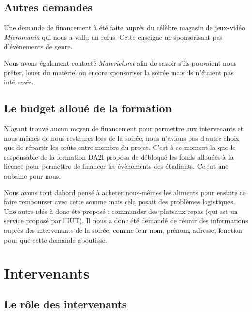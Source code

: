 \subsection{Autres demandes}%
\label{sub:autres_demandes}

Une demande de financement à été faite auprès du célèbre magasin de
jeux-vidéo \emph{Micromania} qui nous a vallu un refus. Cette
enseigne ne sponsorisant pas d'évènements de genre.

Nous avons également contacté \emph{Materiel.net} afin de savoir s'ils
pouvaient nous prêter, louer du matériel ou encore sponsoriser la soirée
mais ils n'étaient pas intéressés.

\subsection{Le budget alloué de la formation}%
\label{sub:le_budget_allou_de_la_formation}

N'ayant trouvé aucun moyen de financement pour permettre aux
intervenants et nous-mêmes de nous restaurer lors de la soirée, nous
n'avions pas d'autre choix que de répartir les coûts entre membre du
projet. C'est à ce moment la que le responsable de la formation DA2I
proposa de débloqué les fonds allouées à la licence pour permettre de
financer les évènements des étudiants. Ce fut une aubaine pour nous.

Nous avons tout dabord pensé à acheter nous-mêmes les aliments pour
ensuite ce faire rembourser avec cette somme mais cela posait des
problèmes logistiques. Une autre idée à donc été proposé : commander des
plateaux repas (qui est un service proposé par l'IUT). Il nous a donc
été demandé de réunir des informations auprès des intervenants de la
soirée, comme leur nom, prénom, adresse, fonction pour que cette demande
aboutisse.


\section{Intervenants}%
\label{sec:intervenants}

\subsection{Le rôle des intervenants}%
\label{sub:le_role_des_intervenants}

